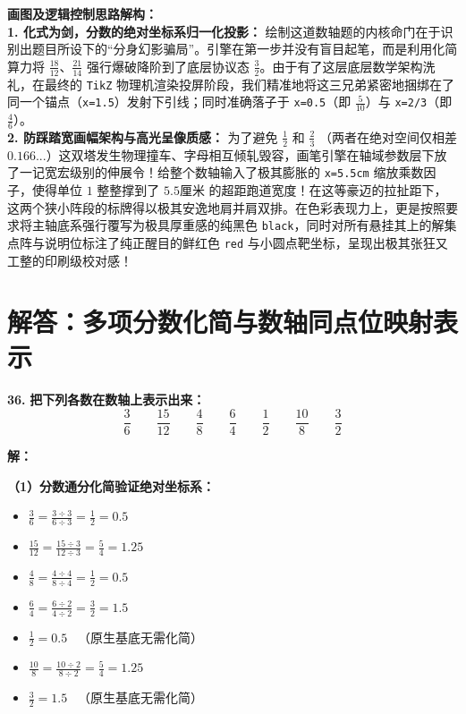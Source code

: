 \vspace{0.4cm}
{\small\color{blue!70!black}
\textbf{画图及逻辑控制思路解构：}\\
\textbf{1. 化式为剑，分数的绝对坐标系归一化投影：} 绘制这道数轴题的内核命门在于识别出题目所设下的“分身幻影骗局”。引擎在第一步并没有盲目起笔，而是利用化简算力将 $\frac{18}{12}、\frac{21}{14}$ 强行爆破降阶到了底层协议态 $\frac{3}{2}$。由于有了这层底层数学架构洗礼，在最终的 \texttt{TikZ} 物理机渲染投屏阶段，我们精准地将这三兄弟紧密地捆绑在了同一个锚点（\texttt{x=1.5}）发射下引线；同时准确落子于 \texttt{x=0.5}（即 $\frac{5}{10}$）与 \texttt{x=2/3}（即 $\frac{4}{6}$）。\\
\textbf{2. 防踩踏宽画幅架构与高光呈像质感：} 为了避免 $\frac{1}{2}$ 和 $\frac{2}{3}$ （两者在绝对空间仅相差 $0.166...$）这双塔发生物理撞车、字母相互倾轧毁容，画笔引擎在轴域参数层下放了一记宽宏级别的伸展令！给整个数轴输入了极其膨胀的 \texttt{x=5.5cm} 缩放乘数因子，使得单位 $1$ 整整撑到了 $5.5\text{厘米}$ 的超距跑道宽度！在这等豪迈的拉扯距下，这两个狭小阵段的标牌得以极其安逸地肩并肩双排。在色彩表现力上，更是按照要求将主轴底系强行覆写为极具厚重感的纯黑色 \texttt{black}，同时对所有悬挂其上的解集点阵与说明位标注了纯正醒目的鲜红色 \texttt{red} 与小圆点靶坐标，呈现出极其张狂又工整的印刷级校对感！
}

\newpage



\section{解答：多项分数化简与数轴同点位映射表示}

\vspace{0.6cm}

\textbf{\LARGE 36.} \textbf{把下列各数在数轴上表示出来：}
\[
\frac{3}{6} \qquad \frac{15}{12} \qquad \frac{4}{8} \qquad \frac{6}{4} \qquad \frac{1}{2} \qquad \frac{10}{8} \qquad \frac{3}{2}
\]

\vspace{0.4cm}
\textbf{解：}

\textbf{（1）分数通分化简验证绝对坐标系：}
\begin{itemize}
    \item $\displaystyle \frac{3}{6} = \frac{3 \div 3}{6 \div 3} = \frac{1}{2} = 0.5$
    \item $\displaystyle \frac{15}{12} = \frac{15 \div 3}{12 \div 3} = \frac{5}{4} = 1.25$
    \item $\displaystyle \frac{4}{8} = \frac{4 \div 4}{8 \div 4} = \frac{1}{2} = 0.5$
    \item $\displaystyle \frac{6}{4} = \frac{6 \div 2}{4 \div 2} = \frac{3}{2} = 1.5$
    \item $\displaystyle \frac{1}{2} = 0.5$ \ （原生基底无需化简）
    \item $\displaystyle \frac{10}{8} = \frac{10 \div 2}{8 \div 2} = \frac{5}{4} = 1.25$
    \item $\displaystyle \frac{3}{2} = 1.5$ \ （原生基底无需化简）
\end{itemize}

